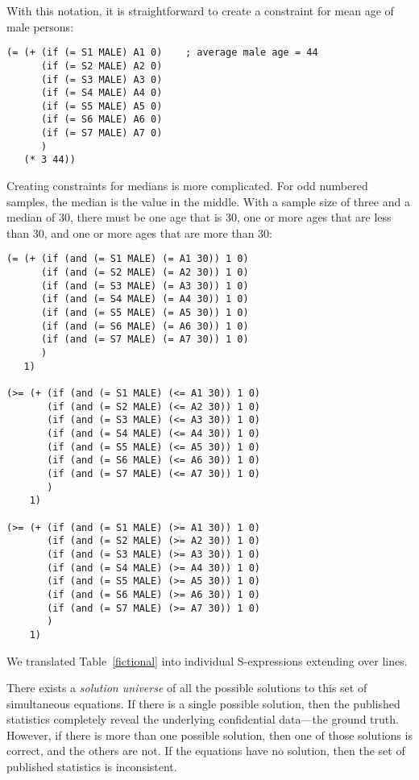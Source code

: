 \documentclass[runningheads]{llncs}
\begin{document}
With this notation, it is straightforward to create a constraint for
mean age of male persons:

\begin{Verbatim}
(= (+ (if (= S1 MALE) A1 0)    ; average male age = 44
      (if (= S2 MALE) A2 0)
      (if (= S3 MALE) A3 0)
      (if (= S4 MALE) A4 0)
      (if (= S5 MALE) A5 0)
      (if (= S6 MALE) A6 0)
      (if (= S7 MALE) A7 0)
      )
   (* 3 44))
\end{Verbatim}

Creating constraints for medians is more complicated. For odd numbered samples, the median is the value in the middle. With a sample size of three and a median of 30, there must be one age that is 30, one or more ages that are less than 30, and one or more ages that are more than 30:

\begin{Verbatim}
(= (+ (if (and (= S1 MALE) (= A1 30)) 1 0)
      (if (and (= S2 MALE) (= A2 30)) 1 0)      
      (if (and (= S3 MALE) (= A3 30)) 1 0)      
      (if (and (= S4 MALE) (= A4 30)) 1 0)      
      (if (and (= S5 MALE) (= A5 30)) 1 0)      
      (if (and (= S6 MALE) (= A6 30)) 1 0)      
      (if (and (= S7 MALE) (= A7 30)) 1 0)
      )
   1)

(>= (+ (if (and (= S1 MALE) (<= A1 30)) 1 0)
       (if (and (= S2 MALE) (<= A2 30)) 1 0)      
       (if (and (= S3 MALE) (<= A3 30)) 1 0)      
       (if (and (= S4 MALE) (<= A4 30)) 1 0)      
       (if (and (= S5 MALE) (<= A5 30)) 1 0)      
       (if (and (= S6 MALE) (<= A6 30)) 1 0)      
       (if (and (= S7 MALE) (<= A7 30)) 1 0)
       )
    1)

(>= (+ (if (and (= S1 MALE) (>= A1 30)) 1 0)
       (if (and (= S2 MALE) (>= A2 30)) 1 0)      
       (if (and (= S3 MALE) (>= A3 30)) 1 0)      
       (if (and (= S4 MALE) (>= A4 30)) 1 0)      
       (if (and (= S5 MALE) (>= A5 30)) 1 0)      
       (if (and (= S6 MALE) (>= A6 30)) 1 0)      
       (if (and (= S7 MALE) (>= A7 30)) 1 0)
       )
    1)
\end{Verbatim}


We translated Table~\ref{fictional} into \NumSExpressions{} individual
S-expressions extending over \NumConstraintLines{} lines. 

There exists a \textit{solution universe} of all the possible solutions to
this set of simultaneous equations. If there is a single possible
solution, then the published statistics completely reveal the
underlying confidential data---the ground truth. However, if
there is more than one possible solution, then one of those solutions
is correct, and the others are not. If the equations have no solution,
then the set of published statistics is inconsistent.
\end{document}

